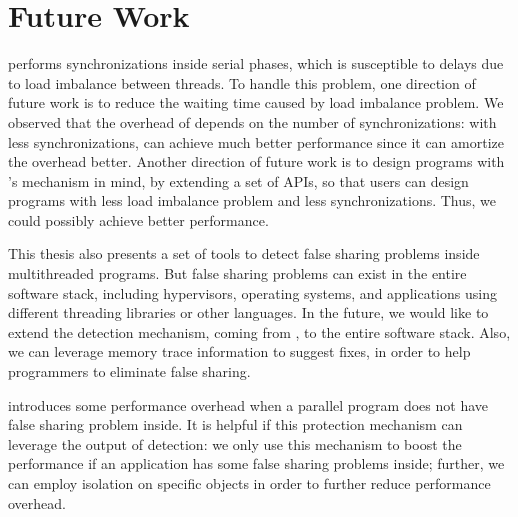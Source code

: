 \section{Future Work}

\dthreads{} performs synchronizations inside serial phases, which is susceptible to delays due to load imbalance between threads. To handle this problem, one direction of future work is to reduce the waiting time caused by load imbalance problem. We observed that the overhead of \dthreads{} depends on the number of synchronizations: with less synchronizations, \dthreads{} can achieve much better performance since it can amortize the overhead better.  Another direction of future work is to design programs with \dthreads{}'s mechanism in mind, by extending a set of APIs, so that users can design programs with less load imbalance problem and less synchronizations. Thus, we could possibly achieve better performance. 

This thesis also presents a set of tools to detect false sharing problems inside multithreaded programs. But false sharing problems can exist in the entire software stack, including hypervisors, operating systems, and applications using different threading libraries or other languages. In the future, we would like to extend the detection mechanism, coming from \predator{}, to the entire software stack. Also, we can leverage memory trace information to suggest fixes, in order to help programmers to eliminate false sharing.

\SheriffProtect{} introduces some performance overhead when a parallel program does not have false sharing problem inside. It is helpful if this protection mechanism can leverage the output of detection: we only use this mechanism to boost the performance if an application has some false sharing problems inside; further, we can employ isolation on specific objects in order to further reduce performance overhead.  